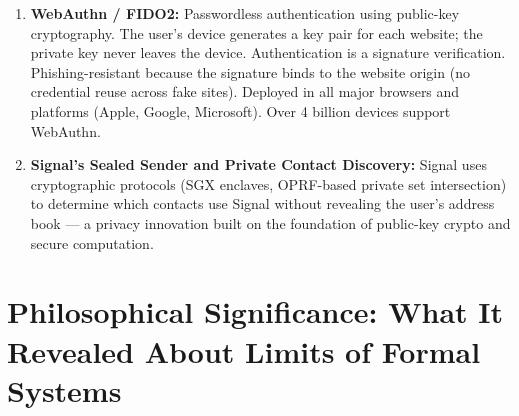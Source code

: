 \begin{enumerate}
\item \textbf{WebAuthn / FIDO2:} Passwordless authentication using public-key cryptography. The user's device generates a key pair for each website; the private key never leaves the device. Authentication is a signature verification. Phishing-resistant because the signature binds to the website origin (no credential reuse across fake sites). Deployed in all major browsers and platforms (Apple, Google, Microsoft). Over 4 billion devices support WebAuthn.

\item \textbf{Signal's Sealed Sender and Private Contact Discovery:} Signal uses cryptographic protocols (SGX enclaves, OPRF-based private set intersection) to determine which contacts use Signal without revealing the user's address book — a privacy innovation built on the foundation of public-key crypto and secure computation.
\end{enumerate}

\section{Philosophical Significance: What It Revealed About Limits of Formal Systems}
\label{sec:crypto:philosophy}

